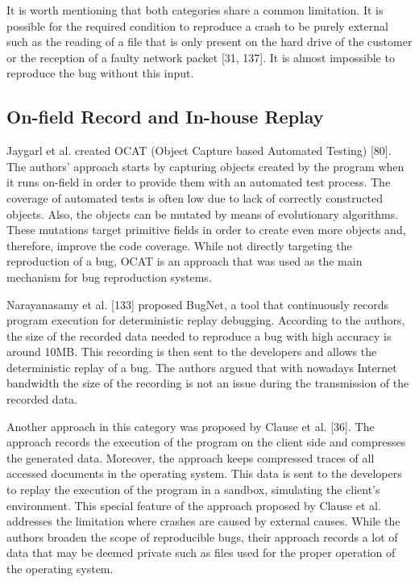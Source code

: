 \documentclass[12pt]{report}
\begin{document}
It is worth mentioning that both categories share a common limitation.
It is possible for the required condition to reproduce a crash to be
purely external such as the reading of a file that is only present on
the hard drive of the customer or the reception of a faulty network
packet {[}31, 137{]}. It is almost impossible to reproduce the bug
without this input.

\subsection{On-field Record and In-house
Replay}\label{on-field-record-and-in-house-replay}

Jaygarl et al. created OCAT (Object Capture based Automated Testing)
{[}80{]}. The authors' approach starts by capturing objects created by
the program when it runs on-field in order to provide them with an
automated test process. The coverage of automated tests is often low due
to lack of correctly constructed objects. Also, the objects can be
mutated by means of evolutionary algorithms. These mutations target
primitive fields in order to create even more objects and, therefore,
improve the code coverage. While not directly targeting the reproduction
of a bug, OCAT is an approach that was used as the main mechanism for
bug reproduction systems.

Narayanasamy et al. {[}133{]} proposed BugNet, a tool that continuously
records program execution for deterministic replay debugging. According
to the authors, the size of the recorded data needed to reproduce a bug
with high accuracy is around 10MB. This recording is then sent to the
developers and allows the deterministic replay of a bug. The authors
argued that with nowadays Internet bandwidth the size of the recording
is not an issue during the transmission of the recorded data.

Another approach in this category was proposed by Clause et al.
{[}36{]}. The approach records the execution of the program on the
client side and compresses the generated data. Moreover, the approach
keeps compressed traces of all accessed documents in the operating
system. This data is sent to the developers to replay the execution of
the program in a sandbox, simulating the client's environment. This
special feature of the approach proposed by Clause et al. addresses the
limitation where crashes are caused by external causes. While the
authors broaden the scope of reproducible bugs, their approach records a
lot of data that may be deemed private such as files used for the proper
operation of the operating system.
\end{document}

